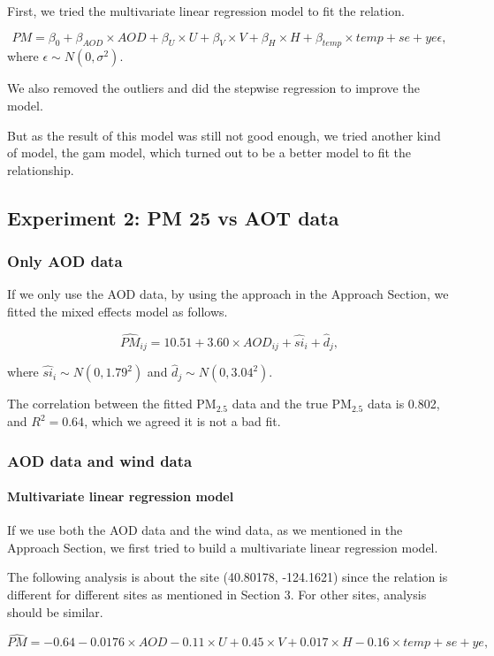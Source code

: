 \documentclass[10pt]{article}
\begin{document}
First, we tried the multivariate linear regression model to fit the relation. 

$$PM = \beta_0 + \beta_{AOD}\times AOD + \beta_{U}\times U + \beta_{V}\times V + \beta_{H}\times H + \beta_{temp}\times temp + se + ye\epsilon, $$
where $\epsilon\sim N(0, \sigma^2)$.

We also removed the outliers and did the stepwise regression to improve the model. 

But as the result of this model was still not good enough, we tried another kind of model, the gam model, which turned out to be a better model to fit the relationship.

\subsection{Experiment 2: PM 25 vs AOT data}
\subsubsection{Only AOD data}
If we only use the AOD data, by using the approach in the Approach Section, we fitted the mixed effects model as follows.

$$\hat{PM}_{ij} = 10.51 + 3.60\times AOD_{ij} + \hat{si}_i + \hat{d}_j, $$

where $\hat{si}_i\sim N(0, 1.79^2)$ and $\hat{d}_j\sim N(0, 3.04^2)$. 

The correlation between the fitted PM$_{2.5}$ data and the true PM$_{2.5}$ data is 0.802, and $R^2 = 0.64$, which we agreed it is not a bad fit. 

\subsubsection{AOD data and wind data}
\paragraph{Multivariate linear regression model}

If we use both the AOD data and the wind data, as we mentioned in the Approach Section, we first tried to build a multivariate linear regression model. 

The following analysis is about the site (40.80178, -124.1621) since the relation is different for different sites as mentioned in Section 3. For other sites, analysis should be similar. 

$$\hat{PM} = -0.64 - 0.0176\times AOD - 0.11\times U + 0.45\times V + 0.017\times H - 0.16\times temp + se + ye, $$
\end{document}
